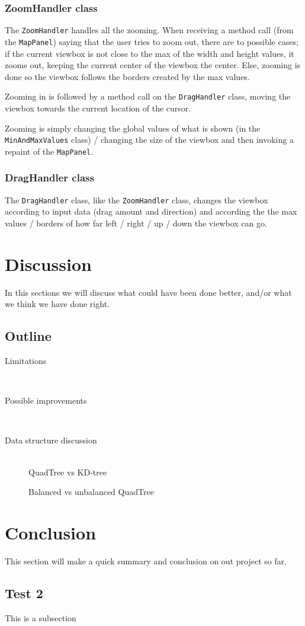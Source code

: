 \documentclass[a4paper,11pt]{article}
\begin{document}
\subsubsection{ZoomHandler class} %
The \texttt{ZoomHandler} handles all the zooming. When receiving a method call (from the \texttt{MapPanel}) saying that the user tries to zoom out, there are to possible cases; if the current viewbox is not close to the max of the width and height values, it zooms out, keeping the current center of the viewbox the center. Else, zooming is done so  the viewbox follows the borders created by the max values.

Zooming in is followed by a method call on the \texttt{DragHandler} class, moving the viewbox towards the current location of the cursor.

Zooming is simply changing the global values of what is shown (in the \texttt{MinAndMaxValues} class) / changing the size of the viewbox and then invoking a repaint of the \texttt{MapPanel}.

\subsubsection{DragHandler class} %
The \texttt{DragHandler} class, like the \texttt{ZoomHandler} class, changes the viewbox according to input data (drag amount and direction) and according the the max values / borders of how far left / right / up / down the viewbox can go.

\pagebreak
\section{Discussion} %
\label{sec:Discussion}
In this sections we will discuss what could have been done better, and/or what we think we have done right.

\subsection{Outline}
\begin{description}
	\item[Limitations] \hfill \\
	
	\item[Possible improvements] \hfill \\
	
	\item[Data structure discussion] \hfill \\
	QuadTree vs KD-tree
	
	Balanced vs unbalanced QuadTree
\end{description}

\pagebreak
\section{Conclusion} %
\label{sec:Conclusion}
This section will make a quick summary and conclusion on out project so far.

\subsection{Test 2}

This is a subsection
\end{document}
